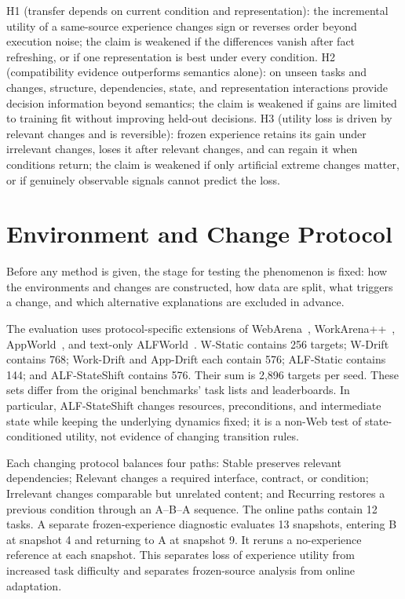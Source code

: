 \documentclass[sigconf,anonymous,review]{acmart}
\theoremstyle{zhplain}
\begin{document}
H1 (transfer depends on current condition and representation): the incremental utility of a same-source experience changes sign or reverses order beyond execution noise; the claim is weakened if the differences vanish after fact refreshing, or if one representation is best under every condition. H2 (compatibility evidence outperforms semantics alone): on unseen tasks and changes, structure, dependencies, state, and representation interactions provide decision information beyond semantics; the claim is weakened if gains are limited to training fit without improving held-out decisions. H3 (utility loss is driven by relevant changes and is reversible): frozen experience retains its gain under irrelevant changes, loses it after relevant changes, and can regain it when conditions return; the claim is weakened if only artificial extreme changes matter, or if genuinely observable signals cannot predict the loss.

\section{Environment and Change Protocol}
\label{sec:protocol}
Before any method is given, the stage for testing the phenomenon is fixed: how the environments and changes are constructed, how data are split, what triggers a change, and which alternative explanations are excluded in advance.

The evaluation uses protocol-specific extensions of WebArena~\cite{webarena}, WorkArena++~\cite{workarena}, AppWorld~\cite{appworld}, and text-only ALFWorld~\cite{alfworld}. W-Static contains 256 targets; W-Drift contains 768; Work-Drift and App-Drift each contain 576; ALF-Static contains 144; and ALF-StateShift contains 576. Their sum is 2,896 targets per seed. These sets differ from the original benchmarks' task lists and leaderboards. In particular, ALF-StateShift changes resources, preconditions, and intermediate state while keeping the underlying dynamics fixed; it is a non-Web test of state-conditioned utility, not evidence of changing transition rules.

Each changing protocol balances four paths: Stable preserves relevant dependencies; Relevant changes a required interface, contract, or condition; Irrelevant changes comparable but unrelated content; and Recurring restores a previous condition through an A--B--A sequence. The online paths contain 12 tasks. A separate frozen-experience diagnostic evaluates 13 snapshots, entering B at snapshot 4 and returning to A at snapshot 9. It reruns a no-experience reference at each snapshot. This separates loss of experience utility from increased task difficulty and separates frozen-source analysis from online adaptation.
\end{document}
